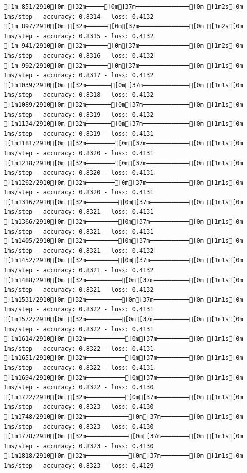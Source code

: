 \documentclass[
  letterpaper,
  DIV=11,
  numbers=noendperiod]{scrartcl}
\begin{document}
\begin{verbatim}
[1m 851/2910[0m [32m━━━━━[0m[37m━━━━━━━━━━━━━━━[0m [1m2s[0m 1ms/step - accuracy: 0.8314 - loss: 0.4132
[1m 897/2910[0m [32m━━━━━━[0m[37m━━━━━━━━━━━━━━[0m [1m2s[0m 1ms/step - accuracy: 0.8315 - loss: 0.4132
[1m 941/2910[0m [32m━━━━━━[0m[37m━━━━━━━━━━━━━━[0m [1m2s[0m 1ms/step - accuracy: 0.8316 - loss: 0.4132
[1m 992/2910[0m [32m━━━━━━[0m[37m━━━━━━━━━━━━━━[0m [1m1s[0m 1ms/step - accuracy: 0.8317 - loss: 0.4132
[1m1039/2910[0m [32m━━━━━━━[0m[37m━━━━━━━━━━━━━[0m [1m1s[0m 1ms/step - accuracy: 0.8318 - loss: 0.4132
[1m1089/2910[0m [32m━━━━━━━[0m[37m━━━━━━━━━━━━━[0m [1m1s[0m 1ms/step - accuracy: 0.8319 - loss: 0.4132
[1m1134/2910[0m [32m━━━━━━━[0m[37m━━━━━━━━━━━━━[0m [1m1s[0m 1ms/step - accuracy: 0.8319 - loss: 0.4131
[1m1181/2910[0m [32m━━━━━━━━[0m[37m━━━━━━━━━━━━[0m [1m1s[0m 1ms/step - accuracy: 0.8320 - loss: 0.4131
[1m1218/2910[0m [32m━━━━━━━━[0m[37m━━━━━━━━━━━━[0m [1m1s[0m 1ms/step - accuracy: 0.8320 - loss: 0.4131
[1m1262/2910[0m [32m━━━━━━━━[0m[37m━━━━━━━━━━━━[0m [1m1s[0m 1ms/step - accuracy: 0.8320 - loss: 0.4131
[1m1316/2910[0m [32m━━━━━━━━━[0m[37m━━━━━━━━━━━[0m [1m1s[0m 1ms/step - accuracy: 0.8321 - loss: 0.4131
[1m1366/2910[0m [32m━━━━━━━━━[0m[37m━━━━━━━━━━━[0m [1m1s[0m 1ms/step - accuracy: 0.8321 - loss: 0.4131
[1m1405/2910[0m [32m━━━━━━━━━[0m[37m━━━━━━━━━━━[0m [1m1s[0m 1ms/step - accuracy: 0.8321 - loss: 0.4132
[1m1452/2910[0m [32m━━━━━━━━━[0m[37m━━━━━━━━━━━[0m [1m1s[0m 1ms/step - accuracy: 0.8321 - loss: 0.4132
[1m1488/2910[0m [32m━━━━━━━━━━[0m[37m━━━━━━━━━━[0m [1m1s[0m 1ms/step - accuracy: 0.8321 - loss: 0.4132
[1m1531/2910[0m [32m━━━━━━━━━━[0m[37m━━━━━━━━━━[0m [1m1s[0m 1ms/step - accuracy: 0.8322 - loss: 0.4131
[1m1572/2910[0m [32m━━━━━━━━━━[0m[37m━━━━━━━━━━[0m [1m1s[0m 1ms/step - accuracy: 0.8322 - loss: 0.4131
[1m1614/2910[0m [32m━━━━━━━━━━━[0m[37m━━━━━━━━━[0m [1m1s[0m 1ms/step - accuracy: 0.8322 - loss: 0.4131
[1m1651/2910[0m [32m━━━━━━━━━━━[0m[37m━━━━━━━━━[0m [1m1s[0m 1ms/step - accuracy: 0.8322 - loss: 0.4131
[1m1694/2910[0m [32m━━━━━━━━━━━[0m[37m━━━━━━━━━[0m [1m1s[0m 1ms/step - accuracy: 0.8322 - loss: 0.4130
[1m1722/2910[0m [32m━━━━━━━━━━━[0m[37m━━━━━━━━━[0m [1m1s[0m 1ms/step - accuracy: 0.8323 - loss: 0.4130
[1m1748/2910[0m [32m━━━━━━━━━━━━[0m[37m━━━━━━━━[0m [1m1s[0m 1ms/step - accuracy: 0.8323 - loss: 0.4130
[1m1778/2910[0m [32m━━━━━━━━━━━━[0m[37m━━━━━━━━[0m [1m1s[0m 1ms/step - accuracy: 0.8323 - loss: 0.4130
[1m1818/2910[0m [32m━━━━━━━━━━━━[0m[37m━━━━━━━━[0m [1m1s[0m 1ms/step - accuracy: 0.8323 - loss: 0.4129

\end{verbatim}
\end{document}
